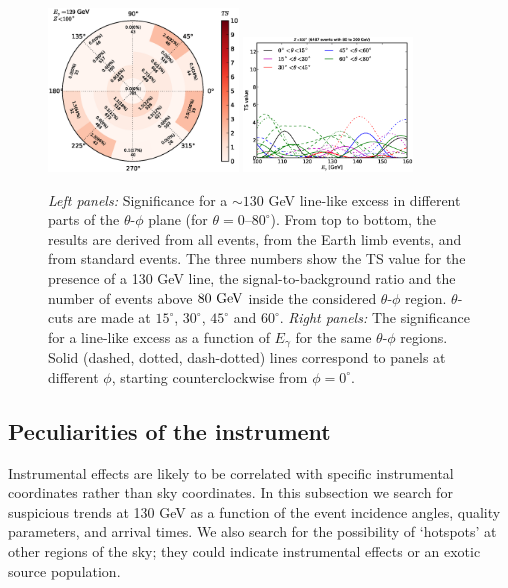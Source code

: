 \documentclass[aps,twocolumn,prd,superscriptaddress,showpacs,nofootinbib,fixfloat]{revtex4}
\newcommand{\GeV}{{\rm ~GeV}}
\begin{document}
\begin{figure}
  \includegraphics[width=0.45\textwidth]{plots/polar_z.LE.100.eps}
  \includegraphics[width=0.40\textwidth]{plots/scan_z.LE.100.eps}
  \caption{\emph{Left panels:} Significance for a $\sim130$ GeV
  line-like excess in different parts of the $\theta$-$\phi$
  plane (for $\theta=0$--$80^\circ$). From top to bottom,
  the results are derived from all events, from the Earth
  limb events, and from standard events. The three numbers
  show the TS value for the presence of a 130 GeV line, the
  signal-to-background ratio and the number of events above
  $80\GeV$ inside the considered $\theta$-$\phi$ region.
  $\theta$-cuts are made at $15^\circ$, $30^\circ$, $45^\circ$ and $60^\circ$.
  \emph{Right panels:} The significance for a
  line-like excess as a function of $E_\gamma$ for the same $\theta$-$\phi$ regions.
  Solid (dashed, dotted, dash-dotted) lines correspond to panels at different
  $\phi$, starting counterclockwise from $\phi=0^\circ$.
  }
  \label{fig:polarPlotsAll}
\end{figure}


\subsection{Peculiarities of the instrument}
Instrumental effects are likely to be correlated with specific instrumental
coordinates rather than sky coordinates. In this subsection we search for
suspicious trends at 130 GeV as a function of the event incidence angles,
quality parameters, and arrival times.  We also search for the possibility of
`hotspots' at other regions of the sky; they could indicate instrumental
effects or an exotic source population.
\end{document}
